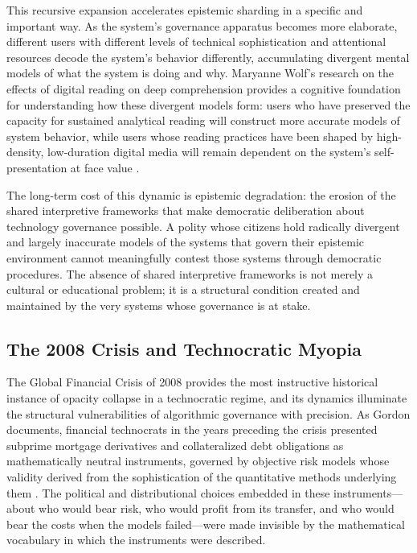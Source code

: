 \documentclass[12pt]{article}
\begin{document}
This recursive expansion accelerates epistemic sharding in a specific and important way. As the system's governance apparatus becomes more elaborate, different users with different levels of technical sophistication and attentional resources decode the system's behavior differently, accumulating divergent mental models of what the system is doing and why. Maryanne Wolf's research on the effects of digital reading on deep comprehension provides a cognitive foundation for understanding how these divergent models form: users who have preserved the capacity for sustained analytical reading will construct more accurate models of system behavior, while users whose reading practices have been shaped by high-density, low-duration digital media will remain dependent on the system's self-presentation at face value \citep{Wolf2018}.

The long-term cost of this dynamic is epistemic degradation: the erosion of the shared interpretive frameworks that make democratic deliberation about technology governance possible. A polity whose citizens hold radically divergent and largely inaccurate models of the systems that govern their epistemic environment cannot meaningfully contest those systems through democratic procedures. The absence of shared interpretive frameworks is not merely a cultural or educational problem; it is a structural condition created and maintained by the very systems whose governance is at stake.

\subsection{The 2008 Crisis and Technocratic Myopia}

The Global Financial Crisis of 2008 provides the most instructive historical instance of opacity collapse in a technocratic regime, and its dynamics illuminate the structural vulnerabilities of algorithmic governance with precision. As Gordon documents, financial technocrats in the years preceding the crisis presented subprime mortgage derivatives and collateralized debt obligations as mathematically neutral instruments, governed by objective risk models whose validity derived from the sophistication of the quantitative methods underlying them \citep{GordonManyWorlds2023}. The political and distributional choices embedded in these instruments---about who would bear risk, who would profit from its transfer, and who would bear the costs when the models failed---were made invisible by the mathematical vocabulary in which the instruments were described.
\end{document}
